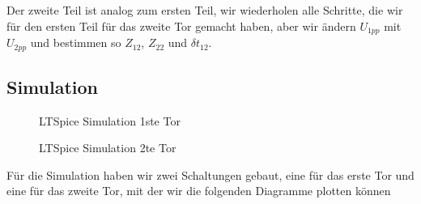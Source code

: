 \par Der zweite Teil ist analog zum ersten Teil, wir wiederholen alle Schritte, die wir für den ersten Teil für das zweite Tor gemacht haben, aber wir ändern $U_{1pp}$ mit $U_{2pp}$ und bestimmen so $Z_{12}$, $Z_{22}$ und $\delta t_{12}$.
%
%
%
\begin{flushright}
  \textit{\autorA}
\end{flushright}
%
%
%
%
\subsection{Simulation}
\label{subsec:3_Simulation}
%
%
\begin{figure}[H]
    \centering
    
    \caption{LTSpice Simulation 1ste Tor}
    \label{fig:LTSpice1}
\end{figure}
\begin{figure}[H]
    \centering
    
    \caption{LTSpice Simulation 2te Tor}
    \label{fig:LTspice2}
\end{figure}
%
Für die Simulation haben wir zwei Schaltungen gebaut, eine für das erste Tor und eine für das zweite Tor, mit der wir die folgenden Diagramme plotten können
%
\begin{flushright}
  \textit{\autorA}
\end{flushright}
%
%
%
%
